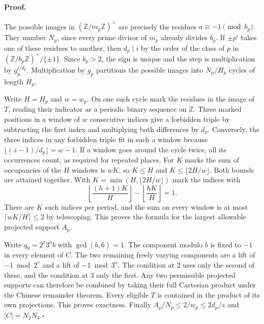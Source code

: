 \paragraph{Proof.}
The possible images in $(\mathbb Z/m_p\mathbb Z)^\times$ are precisely
the residues $a\equiv-1\pmod{b_p}$. They number $N_p$, since every
prime divisor of $m_p$ already divides $b_p$. If $\pm p^i$ takes one
of these residues to another, then $d_p\mid i$ by the order of the
class of $p$ in $(\mathbb Z/b_p\mathbb Z)^\times/\{\pm1\}$. Since
$b_p>2$, the sign is unique and the step is multiplication by
$g_p^{i/d_p}$. Multiplication by $g_p$ partitions the possible images
into $N_p/H_p$ cycles of length $H_p$.

Write $H=H_p$ and $w=w_p$. On one such cycle mark the residues in the
image of $T$, reading their indicator as a periodic binary sequence on
$\mathbb Z$. Three marked positions in a window of $w$ consecutive
indices give a forbidden triple by subtracting the first index and
multiplying both differences by $d_p$. Conversely, the three indices in any
forbidden triple fit in such a window because
$\lfloor(z-1)/d_p\rfloor=w-1$. If a window goes around the cycle twice,
all its occurrences count, as required for repeated places. For $K$ marks
the sum of occupancies of the $H$ windows is $wK$, so $K\le H$ and
$K\le\lfloor2H/w\rfloor$. Both bounds are attained together. With
$K=\min(H,\lfloor2H/w\rfloor)$ mark the indices with
\[
 \left\lfloor\frac{(h+1)K}{H}\right\rfloor-
 \left\lfloor\frac{hK}{H}\right\rfloor=1 .
\]
There are $K$ such indices per period, and the sum on every window is at
most $\lceil wK/H\rceil\le2$ by telescoping. This proves the formula for
the largest allowable projected support $A_p$.

Write $q_0=2^v3^a b$ with $\gcd(b,6)=1$. The component modulo $b$ is
fixed to $-1$ in every element of $C$. The two remaining freely varying
components are a lift of $-1\bmod 2^v$ and a lift of $-1\bmod 3^a$.
The condition at $2$ uses only the second of these, and the condition
at $3$ only the first. Any two permissible projected supports can
therefore be combined by taking their full Cartesian product under
the Chinese remainder theorem. Every eligible $T$ is contained in the
product of its own projections. This proves exactness. Finally
$A_p/N_p\le 2/w_p\le2d_p/z$ and $|C|=N_2N_3$.\hfill$\square$

